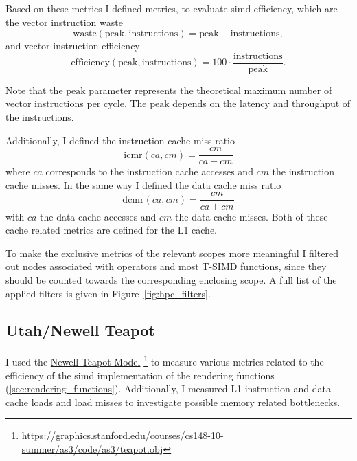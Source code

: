 \documentclass[a4paper, 11pt]{memoir}
\begin{document}
    Based on these metrics I defined metrics, to evaluate \gls{simd} efficiency, which are the vector instruction waste
    \begin{equation}
        \text{waste}(\text{peak}, \text{instructions}) = \text{peak} - \text{instructions},
        \label{eq:vec_waste}
    \end{equation}
    and vector instruction efficiency
    \begin{equation}
        \text{efficiency}(\text{peak}, \text{instructions}) = 100 \cdot \frac{\text{instructions}}{\text{peak}}.
        \label{eq:vec_efficiency}
    \end{equation}

    Note that the $\text{peak}$ parameter represents the theoretical maximum number of vector instructions per cycle. The
    $\text{peak}$ depends on the \gls{latency} and \gls{throughput} of the instructions.

    Additionally, I defined the instruction cache miss ratio
    \begin{equation}
        \text{icmr}(ca, cm) = \frac{cm}{ca + cm}
    \end{equation}
    where $ca$ corresponds to the instruction cache accesses and $cm$ the instruction cache misses. In the same way I defined
    the data cache miss ratio
    \begin{equation}
        \text{dcmr}(ca, cm) = \frac{cm}{ca + cm}
    \end{equation}
    with $ca$ the data cache accesses and $cm$ the data cache misses. Both of these cache related metrics are defined
    for the L1 cache.

    To make the exclusive metrics of the relevant scopes more meaningful I filtered out nodes associated with operators
    and most T-SIMD functions, since they should be counted towards the corresponding enclosing scope. A full list of the
    applied filters is given in Figure~\ref{fig:hpc_filters}.

    \subsection{Utah/Newell Teapot}
    \label{sec:utah_teapot}
    I used the \href{https://graphics.stanford.edu/courses/cs148-10-summer/as3/code/as3/teapot.obj}{Newell Teapot Model}
    \footnote{\href{https://graphics.stanford.edu/courses/cs148-10-summer/as3/code/as3/teapot.obj}{https://graphics.stanford.edu/courses/cs148-10-summer/as3/code/as3/teapot.obj}}
    to measure various metrics related to the efficiency of the \gls{simd} implementation of the rendering functions (\ref{sec:rendering_functions}).
    Additionally, I measured L1 instruction and data cache loads and load misses to investigate possible memory related
    bottlenecks.
\end{document}
